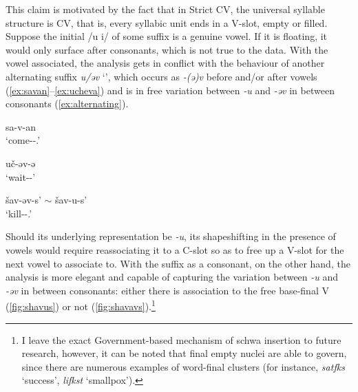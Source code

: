 \documentclass[a4paper, 12pt]{article}
\begin{document}
	\noindent This claim is motivated by the fact that in Strict CV, the universal syllable structure is CV, that is, every syllabic unit ends in a V-slot, empty or filled. Suppose the initial /u i/ of some suffix is a genuine vowel. If it is floating, it would only surface after consonants, which is not true to the data. With the vowel associated, the analysis gets in conflict with the behaviour of another alternating suffix \emph{u/əv} `{\Pass}', which occurs as \emph{-(ə)v} before and/or after vowels (\ref{ex:savan}--\ref{ex:ucheva}) and is in free variation between \emph{-u} and \emph{-əv} in between consonants (\ref{ex:alternating}). 
	
\begin{minipage}[t]{.3\linewidth}
\ex\label{ex:savan}
	sa-v-an \\`come-{\Pass}-{\Npst}.{\Fsg}'
\xe
\end{minipage}
\hfill
\begin{minipage}[t]{.3\linewidth}
\ex\label{ex:ucheva}
	uč-əv-ə \\`wait-{\Pass}-{\Cn}' 
\xe
\end{minipage}	
\hfill
\begin{minipage}[t]{.3\linewidth}
\ex\label{ex:alternating}
	šav-əv-s' $\sim$ šav-u-s' \\ `kill-{\Pass}-{\Pst}.{\Tsg}'
\xe
\end{minipage}	
	
	\noindent Should its underlying representation be \emph{-u}, its shapeshifting in the presence of vowels would require reassociating it to a C-slot so as to free up a V-slot for the next vowel to associate to. With the suffix as a consonant, on the other hand, the analysis is more elegant and capable of capturing the variation between \emph{-u} and \emph{-əv} in between consonants: either there is association to the free base-final V (\ref{fig:shavus}) or not (\ref{fig:shavavs}).\footnote{I leave the exact Government-based mechanism of schwa insertion to future research, however, it can be noted that final empty nuclei are able to govern, since there are numerous examples of word-final clusters (for instance, \emph{satfks} `success', \emph{lifkst} `smallpox').}
	
\end{document}
